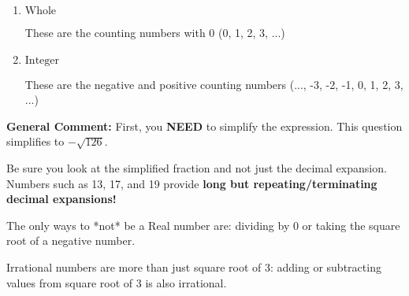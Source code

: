 \documentclass{extbook}[14pt]
\begin{document}
\begin{enumerate}
{\begin{enumerate}[label=\Alph*.]
These are numbers that can be written as fraction of Integers (e.g., -2/3)
\item \( \text{Whole} \)

These are the counting numbers with 0 (0, 1, 2, 3, ...)
\item \( \text{Integer} \)

These are the negative and positive counting numbers (..., -3, -2, -1, 0, 1, 2, 3, ...)
\end{enumerate}

\textbf{General Comment:} First, you \textbf{NEED} to simplify the expression. This question simplifies to $-\sqrt{126}$. 
 
 Be sure you look at the simplified fraction and not just the decimal expansion. Numbers such as 13, 17, and 19 provide \textbf{long but repeating/terminating decimal expansions!} 
 
 The only ways to *not* be a Real number are: dividing by 0 or taking the square root of a negative number. 
 
 Irrational numbers are more than just square root of 3: adding or subtracting values from square root of 3 is also irrational.
}
\end{enumerate}
\end{document}
